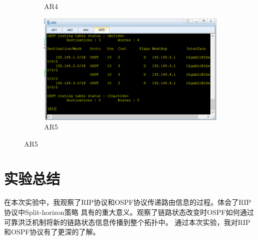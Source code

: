 \documentclass[a4paper,twoside]{article}
\begin{document}
\begin{spacing}{1.2}
\begin{figure}[bp]
\begin{subfigure}{0.4\textwidth}
		\caption{AR4}
		\label{fig:ospfar4}
	\end{subfigure}
	\begin{subfigure}{0.4\textwidth}
		\centering
		\includegraphics[width=\textwidth]{ar5.png}
		\caption{AR5}
		\label{fig:ospfar5}
	\end{subfigure}
\end{figure}

\clearpage
\section{实验总结}

在本次实验中，我观察了RIP协议和OSPF协议传递路由信息的过程。体会了RIP协议中Split-horizon策略
具有的重大意义。观察了链路状态改变时OSPF如何通过可靠洪泛机制将新的链路状态信息传播到整个拓扑中。
通过本次实验，我对RIP和OSPF协议有了更深的了解。

\end{spacing}
\end{document}
